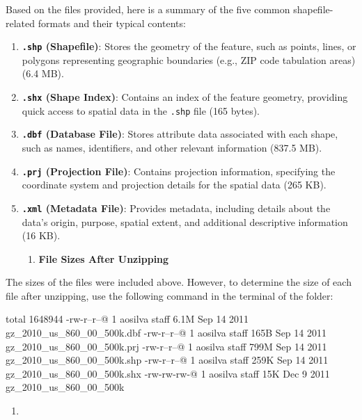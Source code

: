 \documentclass[
  letterpaper,
  DIV=11,
  numbers=noendperiod]{scrartcl}
\providecommand{\tightlist}{%
  \setlength{\itemsep}{0pt}\setlength{\parskip}{0pt}}\usepackage{longtable,booktabs,array}
\begin{document}
Based on the files provided, here is a summary of the five common
shapefile-related formats and their typical contents:

\begin{enumerate}
\def\labelenumi{\arabic{enumi}.}
\item
  \textbf{\texttt{.shp} (Shapefile)}: Stores the geometry of the
  feature, such as points, lines, or polygons representing geographic
  boundaries (e.g., ZIP code tabulation areas) (6.4 MB).
\item
  \textbf{\texttt{.shx} (Shape Index)}: Contains an index of the feature
  geometry, providing quick access to spatial data in the \texttt{.shp}
  file (165 bytes).
\item
  \textbf{\texttt{.dbf} (Database File)}: Stores attribute data
  associated with each shape, such as names, identifiers, and other
  relevant information (837.5 MB).
\item
  \textbf{\texttt{.prj} (Projection File)}: Contains projection
  information, specifying the coordinate system and projection details
  for the spatial data (265 KB).
\item
  \textbf{\texttt{.xml} (Metadata File)}: Provides metadata, including
  details about the data's origin, purpose, spatial extent, and
  additional descriptive information (16 KB).

  \begin{enumerate}
  \def\labelenumii{\alph{enumii}.}
  \setcounter{enumii}{1}
  \tightlist
  \item
    \textbf{File Sizes After Unzipping}
  \end{enumerate}
\end{enumerate}

The sizes of the files were included above. However, to determine the
size of each file after unzipping, use the following command in the
terminal of the folder:

total 1648944 -rw-r--r--@ 1 aosilva staff 6.1M Sep 14 2011
gz\_2010\_us\_860\_00\_500k.dbf -rw-r--r--@ 1 aosilva staff 165B Sep 14
2011 gz\_2010\_us\_860\_00\_500k.prj -rw-r--r--@ 1 aosilva staff 799M
Sep 14 2011 gz\_2010\_us\_860\_00\_500k.shp -rw-r--r--@ 1 aosilva staff
259K Sep 14 2011 gz\_2010\_us\_860\_00\_500k.shx -rw-rw-rw-@ 1 aosilva
staff 15K Dec 9 2011 gz\_2010\_us\_860\_00\_500k

\begin{enumerate}
\def\labelenumi{\arabic{enumi}.}
\setcounter{enumi}{1}
\tightlist
\item
\end{enumerate}
\end{document}
